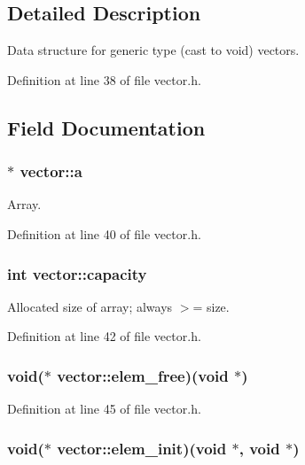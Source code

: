 \subsection{Detailed Description}
Data structure for generic type (cast to void) vectors. 

Definition at line 38 of file vector.h.



\subsection{Field Documentation}
\hypertarget{structvector_ae086a0bd5a910803add11ed953819018}{
\subsubsection[{a}]{$\ast$ {\bf vector::a}}}
\label{structvector_ae086a0bd5a910803add11ed953819018}


Array. 



Definition at line 40 of file vector.h.

\hypertarget{structvector_a95bc684a8044cfc0e509861448908bf2}{
\subsubsection[{capacity}]{\setlength{\rightskip}{0pt plus 5cm}int {\bf vector::capacity}}}
\label{structvector_a95bc684a8044cfc0e509861448908bf2}


Allocated size of array; always $>$= size. 



Definition at line 42 of file vector.h.

\hypertarget{structvector_aa707fd886c386fe365b6d6dbadb49733}{
\subsubsection[{elem\_\-free}]{\setlength{\rightskip}{0pt plus 5cm}void($\ast$ {\bf vector::elem\_\-free})(void $\ast$)}}
\label{structvector_aa707fd886c386fe365b6d6dbadb49733}


Definition at line 45 of file vector.h.

\hypertarget{structvector_a9aa1b736be034d1734173299ba7874e2}{
\subsubsection[{elem\_\-init}]{\setlength{\rightskip}{0pt plus 5cm}void($\ast$ {\bf vector::elem\_\-init})(void $\ast$, void $\ast$)}}
\label{structvector_a9aa1b736be034d1734173299ba7874e2}


